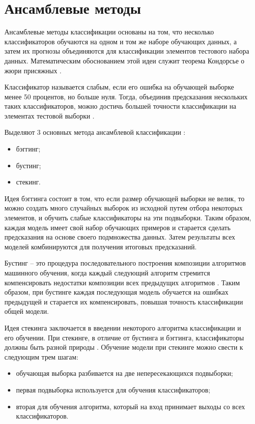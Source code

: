 \section{Ансамблевые методы}
Ансамблевые методы классификации основаны на том, что несколько классификаторов обучаются на одном и том же наборе обучающих данных, а затем их прогнозы объединяются для классификации элементов тестового набора данных. Математическим обоснованием этой идеи служит теорема Кондорсье о жюри присяжных \cite{ansambles}.

Классификатор называется слабым, если его ошибка на обучающей выборке менее 50 процентов, но больше нуля. Тогда, объединив предсказания нескольких таких классификаторов, можно достичь большей точности классификации на элементах тестовой выборки \cite{ansambles}.

Выделяют 3 основных метода ансамблевой классификации \cite{ansambles}:
\begin{itemize}
	\item бэггинг;
	\item бустинг;
	\item стекинг.
\end{itemize}

Идея бэггинга \cite{ntayagabiri2025omic} состоит в том, что если размер обучающей выборки не велик, то можно создать много случайных выборок из исходной путем отбора некоторых элементов, и обучить слабые классификаторы на эти подвыборки. Таким образом, каждая модель имеет свой набор обучающих примеров и старается сделать предсказания на основе своего подмножества данных. Затем результаты всех моделей комбинируются для получения итоговых предсказаний.

Бустинг -- это процедура последовательного построения композиции алгоритмов машинного обучения, когда каждый следующий алгоритм стремится компенсировать недостатки композиции всех предыдущих алгоритмов \cite{ansambles}. Таким образом, при бустинге каждая последующая модель обучается на ошибках предыдущей и старается их компенсировать, повышая точность классификации общей модели.

Идея стекинга \cite{daza2024stacking} заключается в введении некоторого алгоритма классификации и его обучении. При стекинге, в отличие от бустинга и бэггинга, классификаторы должны быть разной природы \cite{ansambles}. Обучение модели при стекинге можно свести к следующим трем шагам:
\begin{itemize}
	\item обучающая выборка разбивается на две непересекающихся подвыборки;
	\item первая подвыборка используется для обучения классификаторов;
	\item вторая для обучения алгоритма, который на вход принимает выходы со всех классификаторов.
\end{itemize}

